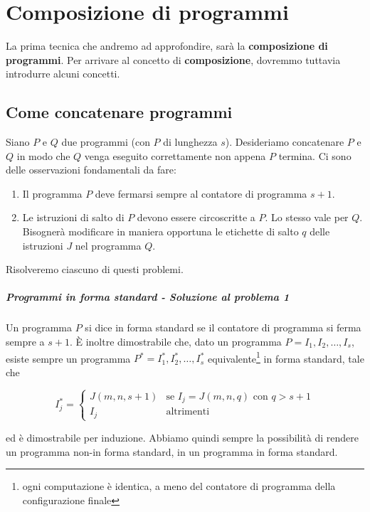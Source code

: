 	\chapter{Composizione di programmi}
	La prima tecnica che andremo ad approfondire, sarà la \textbf{composizione di programmi}. Per arrivare al concetto di \textbf{composizione}, dovremmo tuttavia introdurre alcuni concetti.
	
	
	\section{Come concatenare programmi}
	Siano $P$ e $Q$ due programmi (con $P$ di lunghezza $s$). Desideriamo concatenare $P$ e $Q$ in modo che $Q$ venga eseguito correttamente non appena $P$ termina. Ci sono delle osservazioni fondamentali da fare:
	
	\begin{enumerate}
	\item Il programma $P$ deve fermarsi sempre al contatore di programma $s+1$.
	\item Le istruzioni di salto di $P$ devono essere circoscritte a $P$. Lo stesso vale per $Q$. Bisognerà modificare in maniera opportuna le etichette di salto $q$ delle istruzioni $J$ nel programma $Q$.
	\end{enumerate}
	
	Risolveremo ciascuno di questi problemi.
	
	
	\paragraph{Programmi in forma standard - Soluzione al problema 1} Un programma $P$ si dice in forma standard se il contatore di programma si ferma sempre a $s+1$. È inoltre dimostrabile che, dato un programma $P = I_1,I_2, \dots, I_{s}$, esiste sempre un programma $P^* = I_1^*,I_2^*, \dots, I_{s}^*$ equivalente\footnote{ogni computazione è identica, a meno del contatore di programma della configurazione finale} in forma standard, tale che
	
	$$
	I_j^* = \begin{cases}
	J(m,n,s+1) & \text{se } I_j = J(m,n,q) \text{ con } q > s+1\\
	I_j & \text{altrimenti}
	\end{cases}
	$$
	
	ed è dimostrabile per induzione. Abbiamo quindi sempre la possibilità di rendere un programma non-in forma standard, in un programma in forma standard.
	
